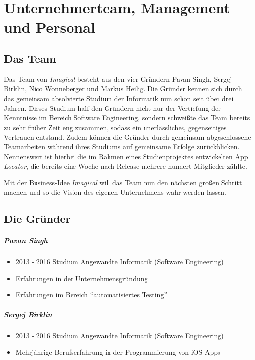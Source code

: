 \chapter{Unternehmerteam, Management und Personal}


\section{Das Team}

Das Team von \textit{Imagical} besteht aus den vier Gründern Pavan Singh, Sergej Birklin, Nico Wonneberger und Markus Heilig.
Die Gründer kennen sich durch das gemeinsam absolvierte Studium der Informatik nun schon seit über drei Jahren.
Dieses Studium half den Gründern nicht nur der Vertiefung der Kenntnisse im Bereich Software Engineering, sondern schweißte das Team bereits zu sehr früher Zeit eng zusammen, sodass ein unerlässliches, gegenseitiges Vertrauen entstand.
Zudem können die Gründer durch gemeinsam abgeschlossene Teamarbeiten während ihres Studiums auf gemeinsame Erfolge zurückblicken.
Nennenswert ist hierbei die im Rahmen eines Studienprojektes entwickelten App \textit{Locator}, die bereits eine Woche nach Release mehrere hundert Mitglieder zählte.

Mit der Business-Idee \textit{Imagical} will das Team nun den nächsten großen Schritt machen und so die Vision des eigenen Unternehmens wahr werden lassen.

\section{Die Gründer}

\paragraph{Pavan Singh}
\begin{itemize}
\item 2013 - 2016 Studium Angewandte Informatik (Software Engineering)
\item Erfahrungen in der Unternehmensgründung
\item Erfahrungen im Bereich ``automatisiertes Testing''
\end{itemize}

\paragraph{Sergej Birklin}
\begin{itemize}
\item 2013 - 2016 Studium Angewandte Informatik (Software Engineering)
\item Mehrjährige Berufserfahrung in der Programmierung von iOS-Apps
\end{itemize}


